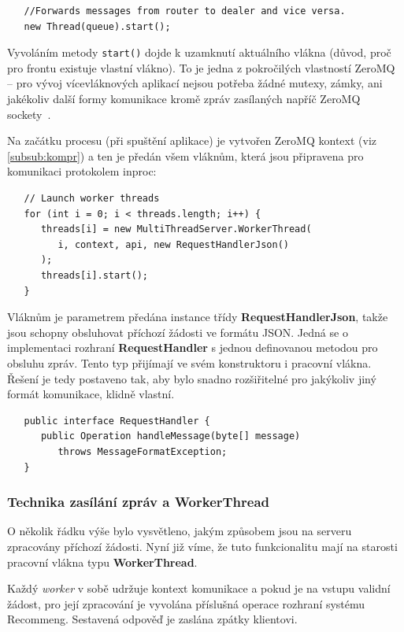\documentclass[thesis=M,czech]{FITthesis}[2014/05/07]
\begin{document}
\begin{verbatim}
   //Forwards messages from router to dealer and vice versa.
   new Thread(queue).start();
\end{verbatim}

Vyvoláním metody \texttt{start()} dojde k uzamknutí aktuálního vlákna (důvod, proč pro frontu existuje vlastní vlákno). To je jedna z pokročilých vlastností ZeroMQ – pro vývoj vícevláknových aplikací nejsou potřeba žádné mutexy, zámky, ani jakékoliv další formy komunikace kromě zpráv zasílaných napříč ZeroMQ sockety~\cite{mtserver}.

Na začátku procesu (při spuštění aplikace) je vytvořen ZeroMQ kontext (viz \ref{subsub:kompr}) a ten je předán všem vláknům, která jsou připravena pro komunikaci protokolem inproc:

\begin{verbatim}
   // Launch worker threads
   for (int i = 0; i < threads.length; i++) {
      threads[i] = new MultiThreadServer.WorkerThread(
         i, context, api, new RequestHandlerJson()
      );
      threads[i].start();
   }
\end{verbatim}

Vláknům je parametrem předána instance třídy \textbf{RequestHandlerJson}, takže jsou schopny obsluhovat příchozí žádosti ve formátu JSON. Jedná se o implementaci rozhraní \textbf{RequestHandler} s jednou definovanou metodou pro obsluhu zpráv. Tento typ přijímají ve svém konstruktoru i pracovní vlákna. Řešení je tedy postaveno tak, aby bylo snadno rozšiřitelné pro jakýkoliv jiný formát komunikace, klidně vlastní.

\begin{verbatim}
   public interface RequestHandler {
      public Operation handleMessage(byte[] message)
         throws MessageFormatException;
   }
\end{verbatim}

\subsubsection{Technika zasílání zpráv a WorkerThread}
O několik řádku výše bylo vysvětleno, jakým způsobem jsou na serveru zpracovány příchozí žádosti. Nyní již víme, že tuto funkcionalitu mají na starosti pracovní vlákna typu \textbf{WorkerThread}.

Každý \emph{worker} v sobě udržuje kontext komunikace a pokud je na vstupu validní žádost, pro její zpracování je vyvolána příslušná operace rozhraní systému Recommeng. Sestavená odpověď je zaslána zpátky klientovi.
\end{document}

